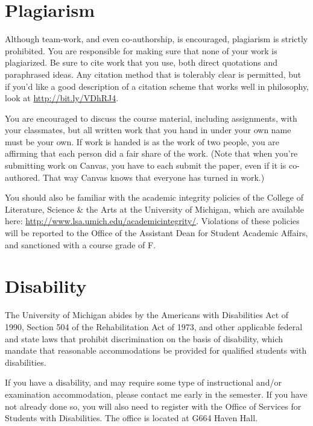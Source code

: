 \documentclass[
]{article}
\begin{document}
\hypertarget{plagiarism}{%
\section{Plagiarism}\label{plagiarism}}

Although team-work, and even co-authorship, is encouraged, plagiarism is
strictly prohibited. You are responsible for making sure that none of
your work is plagiarized. Be sure to cite work that you use, both direct
quotations and paraphrased ideas. Any citation method that is tolerably
clear is permitted, but if you'd like a good description of a citation
scheme that works well in philosophy, look at
\url{http://bit.ly/VDhRJ4}.

You are encouraged to discuss the course material, including
assignments, with your classmates, but all written work that you hand in
under your own name must be your own. If work is handed is as the work
of two people, you are affirming that each person did a fair share of
the work. (Note that when you're submitting work on Canvas, you have to
each submit the paper, even if it is co-authored. That way Canvas knows
that everyone has turned in work.)

You should also be familiar with the academic integrity policies of the
College of Literature, Science \& the Arts at the University of
Michigan, which are available here:
\url{http://www.lsa.umich.edu/academicintegrity/}. Violations of these
policies will be reported to the Office of the Assistant Dean for
Student Academic Affairs, and sanctioned with a course grade of F.

\hypertarget{disability}{%
\section{Disability}\label{disability}}

The University of Michigan abides by the Americans with Disabilities Act
of 1990, Section 504 of the Rehabilitation Act of 1973, and other
applicable federal and state laws that prohibit discrimination on the
basis of disability, which mandate that reasonable accommodations be
provided for qualified students with disabilities.

If you have a disability, and may require some type of instructional
and/or examination accommodation, please contact me early in the
semester. If you have not already done so, you will also need to
register with the Office of Services for Students with Disabilities. The
office is located at G664 Haven Hall.
\end{document}
